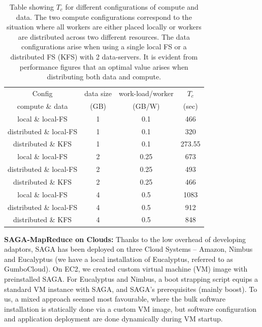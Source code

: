 \documentclass[conference,final]{IEEEtran}
\newcommand{\jhanote}[1]{ {\textcolor{red} { ***SJ: #1 }}}
\newcommand{\jhanote}[1]{}
\newcommand{\tc }{ $T_c$ }
\begin{document}
\begin{table}
\begin{tabular}{cccc}
  \hline
  Config  &  data size   &   work-load/worker & $T_c$  \\
  compute \& data &   (GB)  & (GB/W) & (sec) \\
  \hline
  local \& local-FS & 1 & 0.1 & 466 \\
  \hline
  distributed \& local-FS & 1 & 0.1 & 320 \\
  \hline
  distributed \& KFS & 1 & 0.1 &  273.55 \\
  \hline \hline
  local \& local-FS & 2 & 0.25 & 673 \\
  \hline 
  distributed \& local-FS & 2 & 0.25 & 493 \\
  \hline
  distributed \& KFS & 2 & 0.25 &  466 \\
  \hline \hline
  local \& local-FS &  4 & 0.5 & 1083\\
  \hline
  distributed \& local-FS &  4 &  0.5&  912 \\
  \hline
  distributed \& KFS & 4 & 0.5 &  848  \\
  \hline \hline
\end{tabular}
\caption{Table showing \tc for different configurations of compute  
  and data. The two compute configurations correspond to the situation
  where all workers are either
  placed locally or  workers are distributed across two different resources. The data configurations arise when using a single local FS  or a distributed FS  (KFS) with 2 data-servers. It is evident from performance figures that an optimal value arises when distributing both data and compute.}\label{exp4and5}
\end{table}


{\bf SAGA-MapReduce on Clouds: } Thanks to the low overhead of
developing adaptors, SAGA has been deployed on three Cloud Systems --
Amazon, Nimbus and Eucalyptus (we have a local installation of
Eucalyptus, referred to as GumboCloud).  On EC2, we created custom
virtual machine (VM) image with preinstalled SAGA.  For Eucalyptus and
Nimbus, a boot strapping script equips a standard VM instance with
SAGA, and SAGA's prerequisites (mainly boost).  To us, a mixed
approach seemed most favourable, where the bulk software installation
is statically done via a custom VM image, but software configuration
and application deployment are done dynamically during VM startup.
\end{document}
